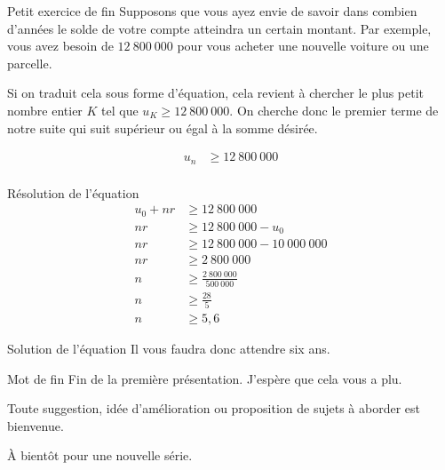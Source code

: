 \documentclass{beamer}
\begin{document}
\begin{frame}{Petit exercice de fin}
Supposons que vous ayez envie de savoir dans combien d'années le solde de votre compte atteindra un certain montant. Par exemple, vous avez besoin de $12\ 800\ 000$ pour vous acheter une nouvelle voiture ou une parcelle.

Si on traduit cela sous forme d'équation, cela revient à chercher le plus petit nombre entier $K$ tel que $u_K \ge 12\ 800\ 000$. On cherche donc le premier terme de notre suite qui suit supérieur ou égal à la somme désirée.

\begin{align*}
  u_n &\ge 12\ 800\ 000 \\
\end{align*}
\end{frame}

\begin{frame}{Résolution de l'équation}
\begin{align*}
  u_0 + nr 	&\ge 12\ 800\ 000 \\
  nr 				&\ge 12\ 800\ 000 - u_0 \\
  nr 				&\ge 12\ 800\ 000 - 10\ 000\ 000 \\
  nr 				&\ge 2\ 800\ 000 \\
  n 				&\ge \frac{2\ 800\ 000}{500\ 000} \\
  n 				&\ge \frac{28}{5} \\
  n 				&\ge 5,6
\end{align*}
\end{frame}

\begin{frame}{Solution de l'équation}
Il vous faudra donc attendre six ans. \Smiley
\end{frame}

\begin{frame}{Mot de fin}
Fin de la première présentation. J'espère que cela vous a plu.

Toute suggestion, idée d'amélioration ou proposition de sujets à aborder est bienvenue.

\`{A} bientôt pour une nouvelle série.

\begin{center}
  \dSmiley[3]
\end{center}
\end{frame}
\end{document}
